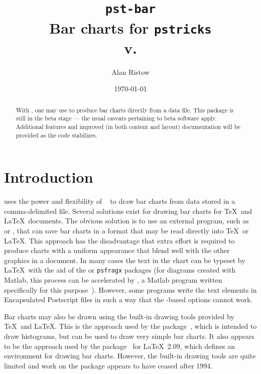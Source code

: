 \documentclass[11pt,english,BCOR=10mm,DIV=14,bibliography=totoc,parskip=false,headings=small,
    headinclude=false,footinclude=false,twoside]{pst-doc}
\let\pstBarVersion\fileversion
\begin{document}
\title{\texttt{pst-bar}\\ Bar charts for \texttt{pstricks}\\
    {\small v.\pstBarVersion}}
\author{Alan Ristow}
\date{\today}
\maketitle

  \begin{abstract}
    With , one may use  to produce bar charts
    directly from a data file. This package is still in the beta stage --- the
    usual caveats pertaining to beta software apply. Additional features and
    improved (in both content and layout) documentation will be provided as the
    code stabilizes.
  \end{abstract}

\section{Introduction}
     uses the power and flexibility of
    ~\cite{pstricks} to draw bar charts from data stored in a
    comma-delimited file. Several solutions exist for drawing bar charts for
    \TeX\ and \LaTeX\ documents. The obvious solution is to use an external
    program, such as  or , that can save bar charts in a format
    that may be read directly into \TeX\ or \LaTeX. This approach has the
    disadvantage that extra effort is required to produce charts with a uniform
    appearance that blend well with the other graphics in a document. In many
    cases the text in the chart can be typeset by \LaTeX\ with the aid of the
     or \verb|psfragx| packages (for diagrams created with Matlab,
    this process can be accelerated by , a Matlab program written
    specifically for this purpose~\cite{linnemann:04}). However, some programs
    write the text elements in Encapsulated Postscript files in such a way that
    the -based options cannot work.

    Bar charts may also be drawn using the built-in drawing tools provided by
    \TeX\ and \LaTeX. This is the approach used by the 
    package~\cite{histogr}, which is intended to draw histograms, but can be
    used to draw very simple bar charts. It also appears to be the approach
    used by the  package~\cite{bar} for \LaTeX\ 2.09, which
    defines an environment for drawing bar charts. However, the built-in
    drawing tools are quite limited and work on the  package appears
    to have ceased after 1994.
\end{document}

